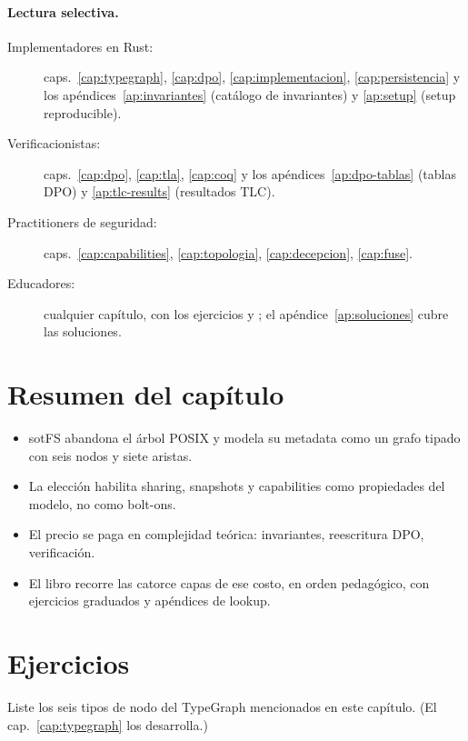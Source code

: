 \paragraph{Lectura selectiva.}
\begin{description}
  \item[Implementadores en Rust:] caps.~\ref{cap:typegraph},
    \ref{cap:dpo}, \ref{cap:implementacion}, \ref{cap:persistencia} y
    los apéndices~\ref{ap:invariantes} (catálogo de invariantes) y
    \ref{ap:setup} (setup reproducible).
  \item[Verificacionistas:] caps.~\ref{cap:dpo}, \ref{cap:tla},
    \ref{cap:coq} y los apéndices~\ref{ap:dpo-tablas} (tablas DPO) y
    \ref{ap:tlc-results} (resultados TLC).
  \item[Practitioners de seguridad:] caps.~\ref{cap:capabilities},
    \ref{cap:topologia}, \ref{cap:decepcion}, \ref{cap:fuse}.
  \item[Educadores:] cualquier capítulo, con los ejercicios
    \dificultad{$\star$} y \dificultad{$\star\star$}; el
    apéndice~\ref{ap:soluciones} cubre las soluciones.
\end{description}

\section*{Resumen del capítulo}

\begin{itemize}
  \item sotFS abandona el árbol POSIX y modela su metadata como un
    grafo tipado con seis nodos y siete aristas.
  \item La elección habilita sharing, snapshots y capabilities como
    propiedades del modelo, no como bolt-ons.
  \item El precio se paga en complejidad teórica: invariantes,
    reescritura DPO, verificación.
  \item El libro recorre las catorce capas de ese costo, en orden
    pedagógico, con ejercicios graduados y apéndices de lookup.
\end{itemize}

\section*{Ejercicios}

\begin{ejercicio}[\dificultad{$\star$}]
\label{ej:intro-1}
Liste los seis tipos de nodo del TypeGraph mencionados en este capítulo.
(El cap.~\ref{cap:typegraph} los desarrolla.)
\end{ejercicio}

